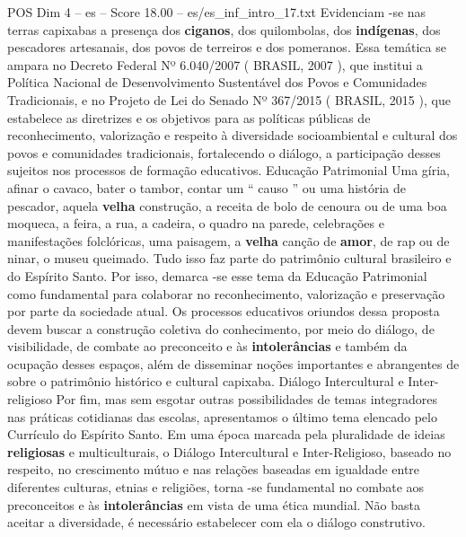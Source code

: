 \begin{textsample}{POS Dim 4 – es – Score 18.00 – es/es\_inf\_intro\_17.txt}
Evidenciam -se nas terras capixabas a presença dos \textbf{ciganos}, dos quilombolas, dos \textbf{indígenas}, dos pescadores artesanais, dos povos de terreiros e dos pomeranos.
Essa temática se ampara no Decreto Federal Nº 6.040/2007 ( BRASIL, 2007 ), que institui a Política Nacional de Desenvolvimento Sustentável dos Povos e Comunidades Tradicionais, e no Projeto de Lei do Senado Nº 367/2015 ( BRASIL, 2015 ), que estabelece as diretrizes e os objetivos para as políticas públicas de reconhecimento, valorização e respeito à diversidade socioambiental e cultural dos povos e comunidades tradicionais, fortalecendo o diálogo, a participação desses sujeitos nos processos de formação educativos.
Educação Patrimonial Uma gíria, afinar o cavaco, bater o tambor, contar um “ causo ” ou uma história de pescador, aquela \textbf{velha} construção, a receita de bolo de cenoura ou de uma boa moqueca, a feira, a rua, a cadeira, o quadro na parede, celebrações e manifestações folclóricas, uma paisagem, a \textbf{velha} canção de \textbf{amor}, de rap ou de ninar, o museu queimado.
Tudo isso faz parte do patrimônio cultural brasileiro e do Espírito Santo.
Por isso, demarca -se esse tema da Educação Patrimonial como fundamental para colaborar no reconhecimento, valorização e preservação por parte da sociedade atual.
Os processos educativos oriundos dessa proposta devem buscar a construção coletiva do conhecimento, por meio do diálogo, de visibilidade, de combate ao preconceito e às \textbf{intolerâncias} e também da ocupação desses espaços, além de disseminar noções importantes e abrangentes de sobre o patrimônio histórico e cultural capixaba.
Diálogo Intercultural e Inter-religioso Por fim, mas sem esgotar outras possibilidades de temas integradores nas práticas cotidianas das escolas, apresentamos o último tema elencado pelo Currículo do Espírito Santo.
Em uma época marcada pela pluralidade de ideias \textbf{religiosas} e multiculturais, o Diálogo Intercultural e Inter-Religioso, baseado no respeito, no crescimento mútuo e nas relações baseadas em igualdade entre diferentes culturas, etnias e religiões, torna -se fundamental no combate aos preconceitos e às \textbf{intolerâncias} em vista de uma ética mundial.
Não basta aceitar a diversidade, é necessário estabelecer com ela o diálogo construtivo.

\end{textsample}
